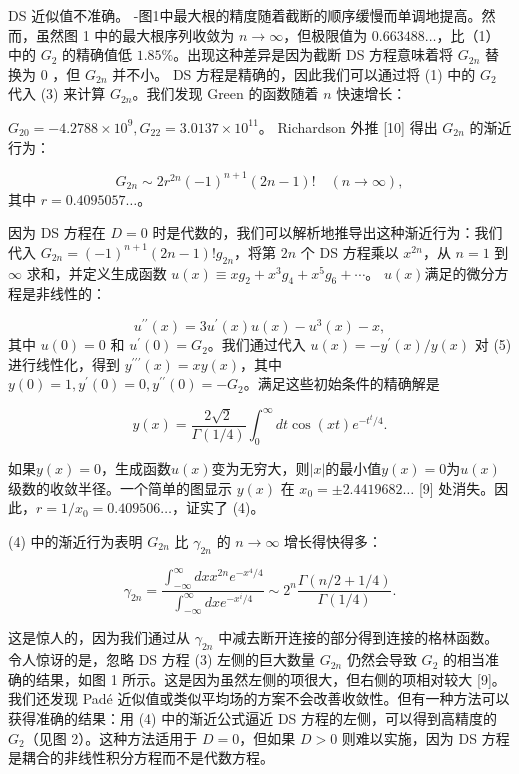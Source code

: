 \documentclass[UTF8]{ctexart}
\begin{document}
DS 近似值不准确。 -图1中最大根的精度随着截断的顺序缓慢而单调地提高。然而，虽然图 1 中的最大根序列收敛为 \( n \rightarrow \infty \)，但极限值为 \( 0.663488 \ldots \)，比（1）中的 \( G_{2} \) 的精确值低 \( 1.85 \% \)。出现这种差异是因为截断 DS 方程意味着将 \( G_{2 n} \) 替换为 0 ，但 \( G_{2 n} \) 并不小。 DS 方程是精确的，因此我们可以通过将 (1) 中的 \( G_{2} \) 代入 (3) 来计算 \( G_{2 n} \)。我们发现 Green 的函数随着 \( n \) 快速增长：




\( G_{20}=-4.2788 \times 10^{9}, G_{22}=3.0137 \times 10^{11} \)。 Richardson 外推 [10] 得出 \( G_{2 n} \) 的渐近行为：


\[
G_{2 n} \sim 2 r^{2 n}(-1)^{n+1}(2 n-1) ! \quad(n \rightarrow \infty),
\] 其中 \( r=0.4095057 \ldots \)。


因为 DS 方程在 \( D=0 \) 时是代数的，我们可以解析地推导出这种渐近行为：我们代入 \( G_{2 n}=(-1)^{n+1}(2 n-1) ! g_{2 n} \)，将第 \( 2 n \) 个 DS 方程乘以 \( x^{2 n} \)，从 \( n=1 \) 到 \( \infty \) 求和，并定义生成函数 \( u(x) \equiv x g_{2}+x^{3} g_{4}+x^{5} g_{6}+\cdots \)。 \( u(x) \)满足的微分方程是非线性的：




\[u^{\prime \prime}(x)=3 u^{\prime}(x) u(x)-u^{3}(x)-x,
\] 其中 \( u(0)=0 \) 和 \( u^{\prime}(0)=G_{2} \)。我们通过代入 \( u(x)=-y^{\prime}(x) / y(x) \) 对 (5) 进行线性化，得到 \( y^{\prime \prime \prime}(x)=x y(x) \)，其中 \( y(0)=1, y^{\prime}(0)=0, y^{\prime \prime}(0)=-G_{2} \)。满足这些初始条件的精确解是




\[y(x)=\frac{2 \sqrt{2}}{\Gamma(1 / 4)} \int_{0}^{\infty} d t \cos (x t) e^{-t^{t} / 4} .
\]


如果\( y(x)=0 \)，生成函数\( u(x) \)变为无穷大，则\( |x| \)的最小值\( y(x)=0 \)为\( u(x) \)级数的收敛半径。一个简单的图显示 \( y(x) \) 在 \( x_{0}= \pm 2.4419682 \ldots \) [9] 处消失。因此，\( r=1 / x_{0}=0.409506 \ldots \)，证实了 (4)。



(4) 中的渐近行为表明 \( G_{2 n} \) 比 \( \gamma_{2 n} \) 的 \( n \rightarrow \infty \) 增长得快得多：




\[
\gamma_{2 n}=\frac{\int_{-\infty}^{\infty} d x x^{2 n} e^{-x^{4} / 4}}{\int_{-\infty}^{\infty} d x e^{-x^{i} / 4}} \sim 2^{n} \frac{\Gamma(n / 2+1 / 4)}{\Gamma(1 / 4)} .
\]


这是惊人的，因为我们通过从 \( \gamma_{2 n} \) 中减去断开连接的部分得到连接的格林函数。
令人惊讶的是，忽略 DS 方程 (3) 左侧的巨大数量 \( G_{2 n} \) 仍然会导致 \( G_{2} \) 的相当准确的结果，如图 1 所示。这是因为虽然左侧的项很大，但右侧的项相对较大 [9]。我们还发现 Padé 近似值或类似平均场的方案不会改善收敛性。但有一种方法可以获得准确的结果：用 (4) 中的渐近公式逼近 DS 方程的左侧，可以得到高精度的 \( G_{2} \)（见图 2）。这种方法适用于 \( D=0 \)，但如果 \( D>0 \) 则难以实施，因为 DS 方程是耦合的非线性积分方程而不是代数方程。
\end{document}
